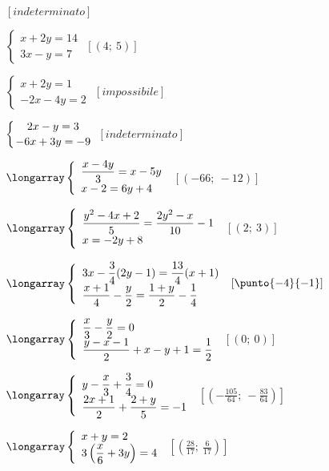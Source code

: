 \begin{esercizio}[\Ast]
\begin{multicols}{2}
\begin{enumeratea}
 \hfill $\left[indeterminato\right]$
\item $\left\{\begin{array}{l}x+2y=14\\3x-y=7\end{array}\right.$
 \hfill $\left[(4;~5)\right]$
\item $\left\{\begin{array}{l}x+2y=1\\-2x-4y=2\end{array}\right.$
 \hfill $\left[impossibile\right]$
\item $\left\{\genfrac{}{}{0pt}{0}{2x-y=3}{-6x+3y=-9}\right.$
 \hfill $\left[indeterminato\right]$
 \item $\longarray\left\{\begin{array}{l}
\dfrac{x-4y}{3}=x-5y\\
x-2=6y+4 \end{array}\right.$
 \hfill $\left[(-66;~-12)\right]$
\item $\longarray\left\{\begin{array}{l}
\dfrac{y^{2}-4x+2}{5}=\dfrac{2y^{2}-x}{10}-1\\
x=-2y+8\end{array}\right.$
 \hfill $\left[(2;~3)\right]$
\item $\longarray\left\{\begin{array}{l}
3x-\dfrac{3}{4}(2y-1)=\dfrac{13}{4}(x+1)\\
\dfrac{x+1}{4}-\dfrac{y}{2}=\dfrac{1+y}{2}-\dfrac{1}{4}\end{array}\right.$
 \hfill $\left[\punto{-4}{-1}\right]$
\item $\longarray\left\{\begin{array}{l}
\dfrac{x}{3}-\dfrac{y}{2}=0\\
\dfrac{y-x-1}{2}+x-y+1=\dfrac{1}{2}\end{array}\right.$
 \hfill $\left[(0;~0)\right]$
\item $\longarray\left\{\begin{array}{l}
y-\dfrac{x}{3}+\dfrac{3}{4}=0\\
\dfrac{2x+1}{2}+\dfrac{2+y}{5}=-1
\end{array}\right.$
 \hfill $\left[\left(-{\frac{105}{64}};~-\frac{83}{64}\right)\right]$
\item $\longarray\left\{\begin{array}{l}
x+y=2\\
3\left(\dfrac{x}{6}+3y\right)=4\end{array}\right.$
 \hfill $\left[\left(\frac{28}{17};~\frac{6}{17}\right)\right]$

\end{enumeratea}
\end{multicols}
\end{esercizio}
